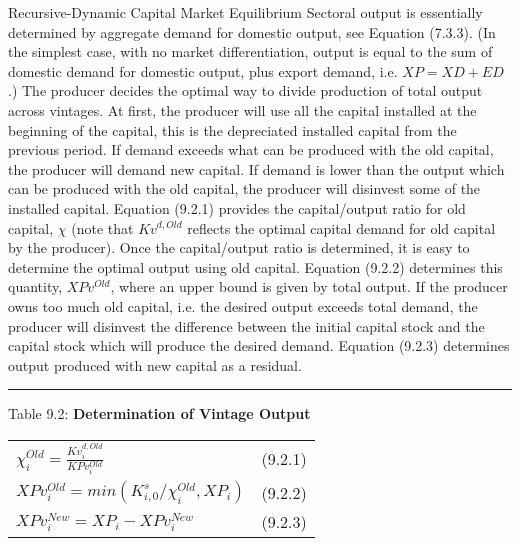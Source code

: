 \documentclass[12pt]{article}
\begin{document}
Recursive-Dynamic Capital Market Equilibrium
Sectoral output is essentially determined by aggregate demand for domestic output, see Equation (7.3.3). (In the simplest case, with no market differentiation, output is equal to the sum of domestic demand for domestic output, plus export demand, i.e. $XP = XD+ED$.) The producer decides the optimal way to divide production of total output across vintages. At first, the producer will use all the capital installed at the beginning of the capital, this is the depreciated installed capital from the previous period. If demand exceeds what can be produced with the old capital, the producer will demand new capital. If demand is lower than the output which can be produced with the old capital, the producer will disinvest some of the installed capital.
Equation (9.2.1) provides the capital/output ratio for old capital, $\chi$ (note that $Kv^{d,Old}$ reflects the optimal capital demand for old capital by the producer). Once the capital/output ratio is determined, it is easy to determine the optimal output using old capital. Equation (9.2.2) determines this quantity, $XPv^{Old}$, where an upper bound is given by total output. If the producer owns too much old capital, i.e. the desired output exceeds total demand, the producer will disinvest the difference between the initial capital stock and the capital stock which will produce the desired demand. Equation (9.2.3) determines output produced with new capital as a residual.


\noindent\rule{\linewidth}{0.4pt}

\begin{center}
\begin{large}


{\centering Table 9.2: \textbf{Determination of Vintage Output} \par}

\begin{tabular}{>{\raggedright}p{} l}

$\chi^{Old}_i = \frac{Kv^{d,Old}_i}{KPv^{Old}_i}$ & (9.2.1) \\[20pt]

$XPv^{Old}_i = min\left(K^s_{i,0} / \chi^{Old}_i, XP_i \right)$ & (9.2.2) \\[15pt]

$XPv^{New}_i = XP_i - XPv^{New}_i$ & (9.2.3) \\[20pt]

\hline
\end{tabular}
\end{large}
\end{center}
\end{document}
